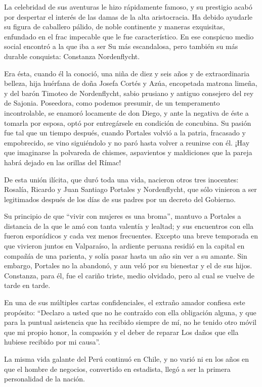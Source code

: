 \documentclass[10pt,twoside,openright]{memoir}
\begin{document}
La celebridad de sus aventuras le hizo rápidamente famoso, y su prestigio 
acabó por despertar el interés de las damas de la alta aristocracia. Ha 
debido ayudarle su figura de caballero pálido, de noble continente y 
maneras exquisitas, enfundado en el frac impecable que le fue característico.
En ese conspicuo medio social encontró a la que iba a ser Su más escandalosa, 
pero también su más durable conquista: Constanza Nordenflycht.

Era ésta, cuando él la conoció, una
niña de diez y seis años y de extraordinaria belleza, hija huérfana de
doña Josefa Cortés y Azúa, encopetada matrona limeña, y del barón
Timoteo de Nordenflycht, sabio prusiano y antiguo consejero del rey de
Sajonia. Poseedora, como podemos presumir, de un temperamento
incontrolable, se enamoró locamente de don Diego, y ante la negativa de
éste a tomarla por esposa, optó por entregársele en condición de
concubina. Su pasión fue tal que un tiempo después, cuando Portales
volvió a la patria, fracasado y empobrecido, se vino siguiéndolo y no
paró hasta volver a reunirse con él. ¡Hay que imaginarse la polvareda de
chismes, aspavientos y maldiciones que la pareja habrá dejado en las
orillas del Rímac!

De esta unión ilícita, que duró
toda una vida, nacieron otros tres inocentes: Rosalía, Ricardo y Juan
Santiago Portales y Nordenflycht, que sólo vinieron a ser legitimados
después de los días de sus padres
por un decreto del Gobierno.

 Su principio de que ``vivir con
mujeres es una broma'', mantuvo a Portales a distancia de la que le amó
con tanta valentía y lealtad; y sus encuentros con ella fueron
esporádicos y cada vez menos frecuentes. Excepto una breve temporada en
que vivieron juntos en Valparaíso, la ardiente peruana residió en la
capital en compañía de una parienta, y solía pasar hasta un año sin ver
a su amante. Sin embargo, Portales no la abandonó, y aun veló por su
bienestar y el de sus hijos. Constanza, para él, fue el cariño
triste, medio olvidado, pero al cual
se vuelve de tarde en tarde.

En una de sus múltiples cartas confidenciales, el extraño amador
confiesa este propósito: ``Declaro a usted que no he contraído con ella
obligación alguna, y que para la puntual asistencia que ha recibido
siempre de mí, no he tenido otro móvil que mi propio honor, la compasión
y el deber de reparar Los daños que ella hubiese recibido por mi causa''.

La misma vida galante del Perú continuó en Chile, y no varió ni en los
años en que el hombre de negocios, convertido en estadista, llegó a ser
la primera personalidad de la nación.
\end{document}
